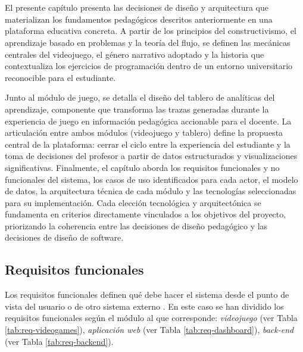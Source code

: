 \chapter{\chapterSecond}

El presente capítulo presenta las decisiones de diseño y arquitectura que materializan los fundamentos pedagógicos descritos anteriormente en una plataforma educativa concreta. A partir de los principios del constructivismo, el aprendizaje basado en problemas y la teoría del flujo, se definen las mecánicas centrales del videojuego, el género narrativo adoptado y la historia que contextualiza los ejercicios de programación dentro de un entorno universitario reconocible para el estudiante.

Junto al módulo de juego, se detalla el diseño del tablero de analíticas del aprendizaje, componente que transforma las trazas generadas durante la experiencia de juego en información pedagógica accionable para el docente. La articulación entre ambos módulos (videojuego y tablero) define la propuesta central de la plataforma: cerrar el ciclo entre la experiencia del estudiante y la toma de decisiones del profesor a partir de datos estructurados y visualizaciones significativas.
Finalmente, el capítulo aborda los requisitos funcionales y no funcionales del sistema, los casos de uso identificados para cada actor, el modelo de datos, la arquitectura técnica de cada módulo y las tecnologías seleccionadas para su implementación. Cada elección tecnológica y arquitectónica se fundamenta en criterios directamente vinculados a los objetivos del proyecto, priorizando la coherencia entre las decisiones de diseño pedagógico y las decisiones de diseño de software.

\section{Requisitos funcionales}

Los requisitos funcionales definen qué debe hacer el sistema desde el punto de vista del usuario o de otro sistema externo \cite{sommerville_software_2011,pressman_ingenierisoftware_2013}. En este caso se han dividido los requisitos funcionales según el módulo al que corresponde: \textit{videojuego} (ver Tabla \ref{tab:req-videogames}), \textit{aplicación web} (ver Tabla \ref{tab:req-dashboard}), \textit{back-end} (ver Tabla \ref{tab:req-backend}).

